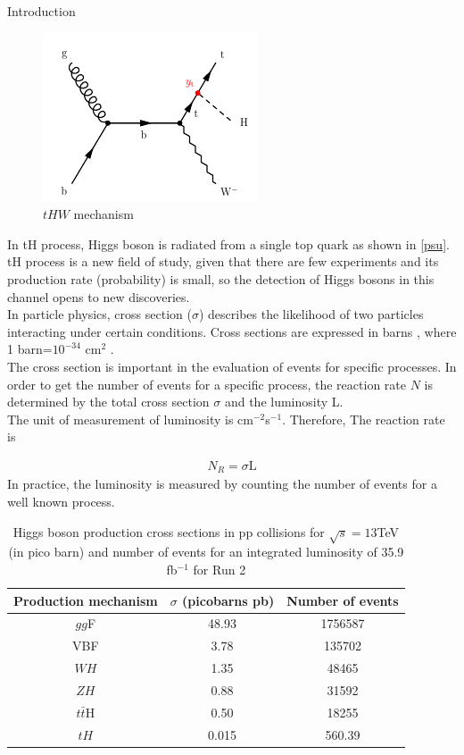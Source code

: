 \begin{chapter}{Introduction}
\begin{figure}[htbp]
\centering
\includegraphics[scale=0.7]{Chapter1/thw.png}
\caption{$tHW$ mechanism}
\label{thw}
\end{figure}

In tH process, Higgs boson is radiated from a single top quark as shown in \ref{psu}. tH process is a new field of study, given that there are few experiments and its production rate (probability) is small, so the detection of Higgs bosons in this channel opens to new discoveries.
\\

In particle physics, cross section ($\sigma$) describes the likelihood of two particles interacting under certain conditions.
 Cross sections are expressed in barns , where 1 barn=$10^{-34}$ cm$^{2}$ .
\\
The cross section is important in the evaluation of events for specific processes. In order to get the number of events for a specific process,  the reaction rate $N$ is determined by the total cross section $\sigma$ and the luminosity L.\\
The unit of measurement of luminosity is  cm$^{-2}$s$^{-1}$.  Therefore, The reaction rate is 

\begin{align} \label{nr}
N_R=\sigma \text{L}
\end{align}
In practice, the luminosity is measured by counting the number of events for a well known process.

\begin{table}[ht]
\centering
\caption{	Higgs boson production cross sections  in pp collisions for $\sqrt{s}=13$TeV  (in pico barn) and number of events for an integrated luminosity of 35.9 fb$^{-1}$ for Run 2 \protect \cite{pd}}
\begin{tabular}{|c|c|c|}
\hline
Production mechanism &
$\sigma$ (picobarns pb) & Number of events \\
\hline
$gg$F & 48.93 & 1756587\\
\hline
VBF & 3.78 & 135702\\
\hline
$WH$ & 1.35 & 48465\\
\hline
$ZH$ &0.88 & 31592\\
\hline
$t\bar{t}$H & 0.50 & 18255\\
\hline
$tH$	& 0.015 & 560.39\\
\hline
\end{tabular}
\label{crt}
\end{table}


\end{chapter}
